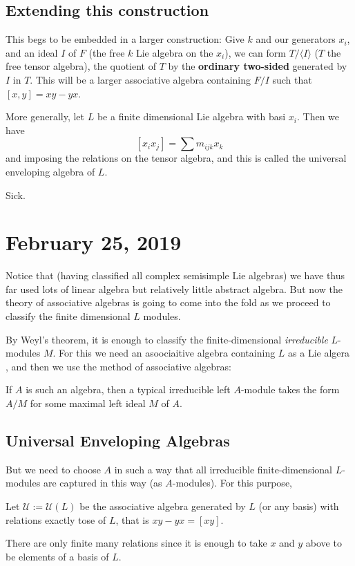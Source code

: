 \documentclass[12pt]{article}
\theoremstyle{nonumberbreak}
\theoremstyle{changebreak}
\theoremstyle{nonumberbreak}
\theoremstyle{change}
\begin{document}
\subsection{Extending this construction}
This begs to be embedded in a larger construction: Give $k$ and our generators $x_i$, and an ideal $I$ 
of $F$ (the free $k$ Lie algebra on the $x_i$), we can form $T/\langle I\rangle$ ($T$ the free tensor algebra), the quotient of $T$ by the 
\textbf{ordinary two-sided} generated by $I$ in $T$. This will be a larger associative algebra containing $F/I$ such that
$[x,y]=xy-yx$.

More generally, let $L$ be a finite dimensional Lie algebra with basi $x_i$. Then we have 
\[[x_ix_j]=\sum m_{ijk}x_k\]
and imposing the relations on the tensor algebra, and this is called the universal enveloping algebra of $L$.

Sick.

\section{February 25, 2019}
Notice that (having classified all complex semisimple Lie algebras) we have thus far used lots of linear algebra
but relatively little abstract algebra. But now the theory of associative algebras is going to come into the fold
as we proceed to classify the finite dimensional $L$ modules.

By Weyl's theorem, it is enough to classify the finite-dimensional \textit{irreducible} $L$-modules $M$.
For this we need an asoociaitive algebra containing $L$ as a Lie algera , and then we use the method of associative algebras:
\begin{ex}
	If $A$ is such an algebra, then a typical irreducible left $A$-module takes the form $A/M$
	for some maximal left ideal $M$ of $A$.
\end{ex}

\subsection{Universal Enveloping Algebras}
But we need to choose $A$ in such a way that all irreducible finite-dimensional $L$-modules are captured
in this way (as $A$-modules). For this purpose,
\begin{defn}
	Let $\mathcal U:=\mathcal U(L)$ be the associative algebra generated by $L$ (or any basis) with relations exactly tose of $L$,
	that is $xy-yx=[xy]$.

	There are only finite many relations since it is enough to take $x$ and $y$ above to be elements of a basis of $L$.
\end{defn}
\end{document}
